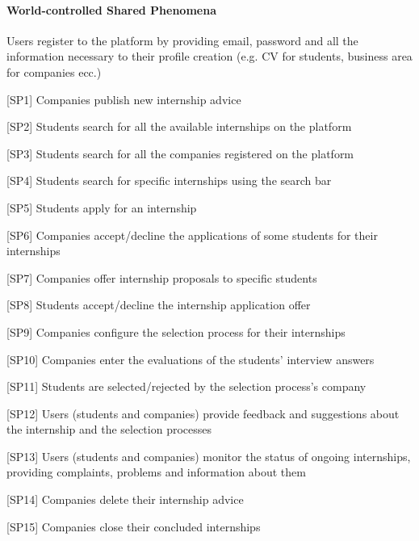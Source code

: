 				\paragraph{World-controlled Shared Phenomena}
					\begin{flushleft}
											[SP0] Users register to the platform by providing email, password and all the information necessary to their profile creation (e.g. CV for students, business area for companies ecc.)
											
											[SP1] Companies publish new internship advice
											
											[SP2] Students search for all the available internships on the platform
											
											[SP3] Students search for all the companies registered on the platform
											
											[SP4] Students search for specific internships using the search bar
											
											[SP5] Students apply for an internship
											
											[SP6] Companies accept/decline the applications of some students for their internships
											
											[SP7] Companies offer internship proposals to specific students
											
											[SP8] Students accept/decline the internship application offer
											
											[SP9] Companies configure the selection process for their internships
											
											[SP10] Companies enter the evaluations of the students' interview answers
											
											[SP11] Students are selected/rejected by the selection process's company 
											
											[SP12] Users (students and companies) provide feedback and suggestions about the internship and the selection processes
											
											[SP13] Users (students and companies) monitor the status of ongoing internships, providing complaints, problems and information about them
											
											[SP14] Companies delete their internship advice
											
											[SP15] Companies close their concluded internships
 					\end{flushleft}
				
